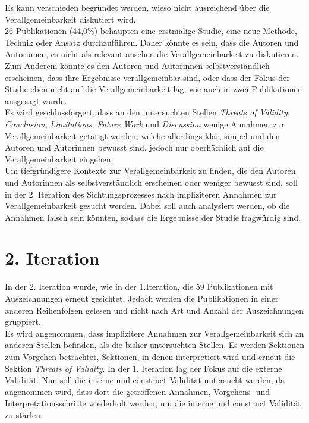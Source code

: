 Es kann verschieden begründet werden, wieso nicht ausreichend über die Verallgemeinbarkeit diskutiert wird.\\
26 Publikationen (44,0\%) behaupten eine erstmalige Studie, eine neue Methode, Technik oder Ansatz durchzuführen.
Daher könnte es sein, dass die Autoren und Autorinnen, es nicht als relevant ansehen die Verallgemeinbarkeit zu diskutieren.
Zum Anderem könnte es den Autoren und Autorinnen selbstverständlich erscheinen, dass ihre Ergebnisse verallgemeinbar sind,
oder dass der Fokus der Studie eben nicht auf die Verallgemeinbarkeit lag, wie auch in zwei Publikationen ausgesagt wurde. \\

Es wird geschlussforgert, dass an den untersuchten Stellen \textit{Threats of Validity}, \textit{Conclusion}, \textit{Limitations}, \textit{Future Work} und \textit{Discussion}
wenige Annahmen zur Verallgemeinbarkeit getätigt werden, welche allerdings klar, simpel und den Autoren und Autorinnen bewusst sind, jedoch nur oberflächlich auf die Verallgemeinbarkeit eingehen. \\
Um tiefgründigere Kontexte zur Verallgemeinbarkeit zu finden, die den Autoren und Autorinnen als selbstverständlich erscheinen oder weniger bewusst sind,
soll in der 2. Iteration des Sichtungsprozesses nach impliziteren Annahmen zur Verallgemeinbarkeit gesucht werden.
Dabei soll auch analysiert werden, ob die Annahmen falsch sein könnten, sodass die Ergebnisse der Studie fragwürdig sind.

\clearpage

\section{2. Iteration}
In der 2. Iteration wurde, wie in der 1.Iteration, die 59 Publikationen mit Auszeichnungen erneut gesichtet.
Jedoch werden die Publikationen in einer anderen Reihenfolgen gelesen und nicht nach Art und Anzahl der Auszeichnungen gruppiert. \\

Es wird angenommen, dass implizitere Annahmen zur Verallgemeinbarkeit sich an anderen Stellen befinden, als die bisher untersuchten Stellen. Es werden Sektionen zum Vorgehen betrachtet, Sektionen, in denen interpretiert wird und erneut die Sektion \textit{Threats of Validity}. In der 1. Iteration lag der Fokus auf die externe Validität. Nun soll die interne und construct Validität untersucht werden, da angenommen wird, dass dort die getroffenen Annahmen, Vorgehens- und Interpretationsschritte wiederholt werden, um die interne und construct Validität zu stärlen.

